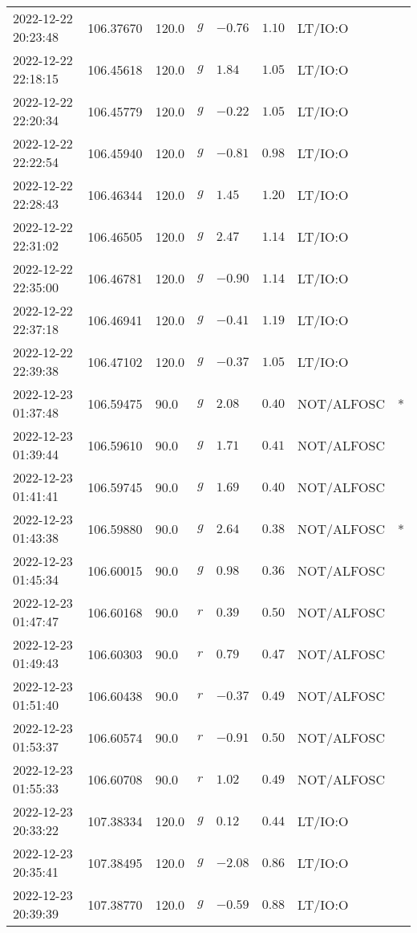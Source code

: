\documentclass{nature_plusfigure}
\begin{document}
\begin{supplement}
\begin{center}
\begin{longtable}{llllllll}
2022-12-22 20:23:48 & 106.37670 & 120.0 & $g$ & $-0.76$ & $1.10$ & LT/IO:O &  \\ 
2022-12-22 22:18:15 & 106.45618 & 120.0 & $g$ & $1.84$ & $1.05$ & LT/IO:O &  \\ 
2022-12-22 22:20:34 & 106.45779 & 120.0 & $g$ & $-0.22$ & $1.05$ & LT/IO:O &  \\ 
2022-12-22 22:22:54 & 106.45940 & 120.0 & $g$ & $-0.81$ & $0.98$ & LT/IO:O &  \\ 
2022-12-22 22:28:43 & 106.46344 & 120.0 & $g$ & $1.45$ & $1.20$ & LT/IO:O &  \\ 
2022-12-22 22:31:02 & 106.46505 & 120.0 & $g$ & $2.47$ & $1.14$ & LT/IO:O &  \\ 
2022-12-22 22:35:00 & 106.46781 & 120.0 & $g$ & $-0.90$ & $1.14$ & LT/IO:O &  \\ 
2022-12-22 22:37:18 & 106.46941 & 120.0 & $g$ & $-0.41$ & $1.19$ & LT/IO:O &  \\ 
2022-12-22 22:39:38 & 106.47102 & 120.0 & $g$ & $-0.37$ & $1.05$ & LT/IO:O &  \\ 
2022-12-23 01:37:48 & 106.59475 & 90.0 & $g$ & $2.08$ & $0.40$ & NOT/ALFOSC & * \\ 
2022-12-23 01:39:44 & 106.59610 & 90.0 & $g$ & $1.71$ & $0.41$ & NOT/ALFOSC &  \\ 
2022-12-23 01:41:41 & 106.59745 & 90.0 & $g$ & $1.69$ & $0.40$ & NOT/ALFOSC &  \\ 
2022-12-23 01:43:38 & 106.59880 & 90.0 & $g$ & $2.64$ & $0.38$ & NOT/ALFOSC & * \\ 
2022-12-23 01:45:34 & 106.60015 & 90.0 & $g$ & $0.98$ & $0.36$ & NOT/ALFOSC &  \\ 
2022-12-23 01:47:47 & 106.60168 & 90.0 & $r$ & $0.39$ & $0.50$ & NOT/ALFOSC &  \\ 
2022-12-23 01:49:43 & 106.60303 & 90.0 & $r$ & $0.79$ & $0.47$ & NOT/ALFOSC &  \\ 
2022-12-23 01:51:40 & 106.60438 & 90.0 & $r$ & $-0.37$ & $0.49$ & NOT/ALFOSC &  \\ 
2022-12-23 01:53:37 & 106.60574 & 90.0 & $r$ & $-0.91$ & $0.50$ & NOT/ALFOSC &  \\ 
2022-12-23 01:55:33 & 106.60708 & 90.0 & $r$ & $1.02$ & $0.49$ & NOT/ALFOSC &  \\ 
2022-12-23 20:33:22 & 107.38334 & 120.0 & $g$ & $0.12$ & $0.44$ & LT/IO:O &  \\ 
2022-12-23 20:35:41 & 107.38495 & 120.0 & $g$ & $-2.08$ & $0.86$ & LT/IO:O &  \\ 
2022-12-23 20:39:39 & 107.38770 & 120.0 & $g$ & $-0.59$ & $0.88$ & LT/IO:O &  \\ 

\end{longtable}
\end{center}
\end{supplement}
\end{document}
